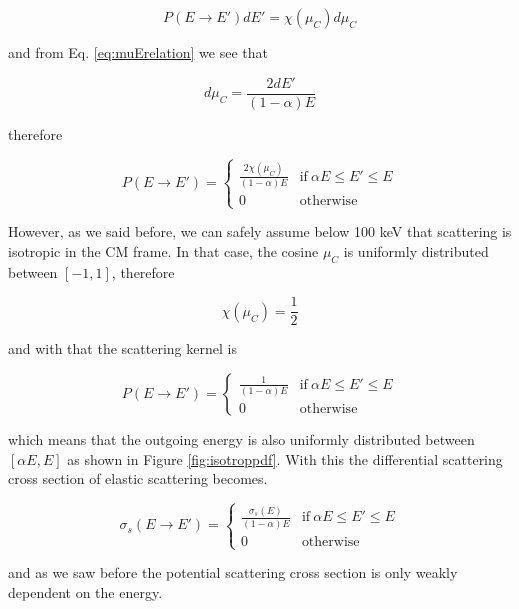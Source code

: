 $$P(E\rightarrow E')dE'=\chi(\mu_C)d\mu_C$$

\noindent and from  Eq. \eqref{eq:muErelation} we see that

$$d\mu_C=\frac{2dE'}{(1-\alpha)E}$$

\noindent therefore

\begin{equation}
    P(E\rightarrow E') = 
    \begin{cases}
      \frac{2\chi(\mu_C)}{(1-\alpha)E} & \text{if} \: \alpha E \leq E' \leq E \\
      0 & \text{otherwise}
    \end{cases}
\end{equation}

However, as we said before, we can safely assume below 100 keV that scattering is isotropic in the CM frame. In that case, the cosine $\mu_C$ is uniformly distributed between $[-1,1]$, therefore

$$\chi(\mu_C)=\frac{1}{2}$$

\noindent and with that the scattering kernel is

\begin{equation}
    P(E\rightarrow E') = 
    \begin{cases}
      \frac{1}{(1-\alpha)E} & \text{if} \: \alpha E \leq E' \leq E \\
      0 & \text{otherwise}
    \end{cases}
\end{equation}

\noindent which means that the outgoing energy is also uniformly distributed between $[\alpha E, E]$ as shown in Figure \ref{fig:isotroppdf}. With this the differential scattering cross section of elastic scattering becomes.

\begin{equation}
    \sigma_s(E\rightarrow E') = 
    \begin{cases}
      \frac{\sigma_s(E)}{(1-\alpha)E} & \text{if} \: \alpha E \leq E' \leq E \\
      0 & \text{otherwise}
    \end{cases}
\end{equation}

\noindent and as we saw before the potential scattering cross section is only weakly dependent on the energy.

